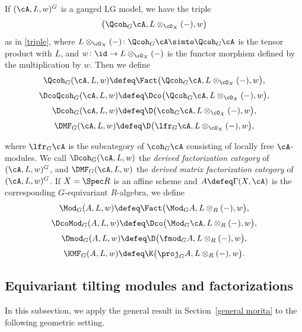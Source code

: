 If $(\cA,L,w)^G$ is a gauged LG model, we have the triple
\begin{gather*}
\big(\Qcoh_G\cA,L\otimes_{\cO_X}(-),w\big)
\end{gather*}
as in \eqref{triple}, where $L\otimes_{\cO_X}(-)\colon \Qcoh_G\cA\simto \Qcoh_G\cA$ is the tensor product with $L$, and $w\colon\id\to L\otimes_{\cO_X}(-)$ is the functor morphism defined by the multiplication by $w$. Then we define
\begin{gather*}
\Qcoh_G(\cA,L,w)\defeq\Fact\big(\Qcoh_G\cA,L\otimes_{\cO_X}(-),w\big),
\\[.5ex]
\DcoQcoh_G(\cA,L,w)\defeq\Dco\big(\Qcoh_G\cA,L\otimes_{\cO_X}(-),w\big),
\\[.5ex]
\Dcoh_G(\cA,L,w)\defeq\D\big(\coh_G\cA,L\otimes_{\cO_X}(-),w\big),
\\[.5ex]
\DMF_G(\cA,L,w)\defeq\D\big(\lfr_G\cA,L\otimes_{\cO_X}(-),w\big),
\end{gather*}
{\sloppy
where $\lfr_G\cA$ is the subcategory of $\coh_G\cA$ consisting of locally free $\cA$-modules. We call $\Dcoh_G(\cA,L,w)$ the {\it derived factorization category} of $(\cA,L,w)^G$, and $\DMF_G(\cA,L,w)$ the {\it derived matrix factorization category} of $(\cA,L,w)^G$. If $X=\Spec R$ is an affine scheme and $A\defeq\Gamma(X,\cA)$ is the corresponding $G$-equivariant $R$-algebra, we define
\begin{gather*}
\Mod_G(A,L,w)\defeq\Fact\big(\Mod_GA,L\otimes_{R}(-),w\big),
\\[.5ex]
\DcoMod_G(A,L,w)\defeq\Dco\big(\Mod_G\cA,L\otimes_{R}(-),w\big),
\\[.5ex]
\Dmod_G(A,L,w)\defeq\D\big(\fmod_GA,L\otimes_{R}(-),w\big),
\\[.5ex]
\KMF_G(A,L,w)\defeq\K\big(\proj_GA,L\otimes_{R}(-),w\big).
\end{gather*}

}


\subsection{Equivariant tilting modules and factorizations}
In this subsection, we apply the general result in Section~\ref{general morita} to the following geometric setting.

